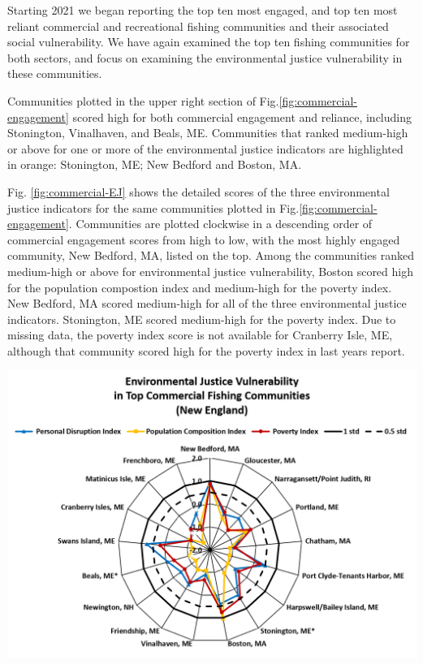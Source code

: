 \documentclass[
  10pt,
]{article}
\let\origfigure\figure
\let\endorigfigure\endfigure
\renewenvironment{figure}[1][2] {
    \expandafter\origfigure\expandafter[H]
} {
    \endorigfigure
}
\begin{document}
Starting 2021 we began reporting the top ten most engaged, and top ten most reliant commercial and recreational fishing communities and their associated social vulnerability. We have again examined the top ten fishing communities for both sectors, and focus on examining the environmental justice vulnerability in these communities.

Communities plotted in the upper right section of Fig.\ref{fig:commercial-engagement} scored high for both commercial engagement and reliance, including Stonington, Vinalhaven, and Beals, ME. Communities that ranked medium-high or above for one or more of the environmental justice indicators are highlighted in orange: Stonington, ME; New Bedford and Boston, MA.

Fig. \ref{fig:commercial-EJ} shows the detailed scores of the three environmental justice indicators for the same communities plotted in Fig.\ref{fig:commercial-engagement}. Communities are plotted clockwise in a descending order of commercial engagement scores from high to low, with the most highly engaged community, New Bedford, MA, listed on the top. Among the communities ranked medium-high or above for environmental justice vulnerability, Boston scored high for the population compostion index and medium-high for the poverty index. New Bedford, MA scored medium-high for all of the three environmental justice indicators. Stonington, ME scored medium-high for the poverty index. Due to missing data, the poverty index score is not available for Cranberry Isle, ME, although that community scored high for the poverty index in last years report.

\begin{figure}

{\centering \includegraphics[width=0.75\linewidth]{SOE-NEFMC_files/figure-latex/commercial-EJ-1} 

}

\caption{Environmental justice indicators (Poverty Index, population composition index, and personal disruption index) for top commercial fishing communities in New England. *Community scored high (1.00 and above) for both commercial engagement and reliance indicators.}\label{fig:commercial-EJ}
\end{figure}
\end{document}
